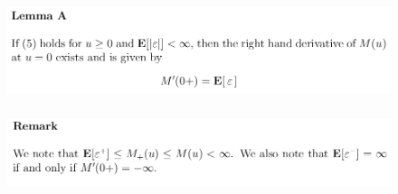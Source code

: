\documentclass[c, dvipsnames, 8pt]{beamer}
\begin{document}
\begin{frame}[shrink=5]
	
	
	
	\frametitle{\insertsection} 
	\begin{figure}
		\centering
		\includegraphics[width=1\linewidth]{screenshot044}
		\label{fig:screenshot001}
	\end{figure}
	
	
		\frametitle{\insertsection} 
	\begin{figure}
		\centering
		\includegraphics[width=1\linewidth]{screenshot045}
		\label{fig:screenshot001}
	\end{figure}
	
	

	
	
\end{frame}
\end{document}
